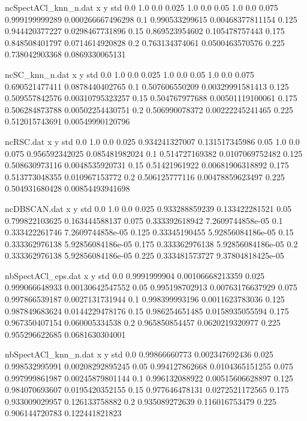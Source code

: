\begin{filecontents}{ncSpectACl_knn_n.dat}
x y std
0.0 1.0 0.0
0.025 1.0 0.0
0.05 1.0 0.0
0.075 0.999199999289 0.000266667496298
0.1 0.990533299615 0.00468377811154
0.125 0.944420377227 0.0298467731896
0.15 0.869523954602 0.105478757443
0.175 0.848508401797 0.0714614920828
0.2 0.763134374061 0.0500463570576
0.225 0.738042903368 0.0869330065131
\end{filecontents}
\begin{filecontents}{ncSC_knn_n.dat}
x y std
0.0 1.0 0.0
0.025 1.0 0.0
0.05 1.0 0.0
0.075 0.690521477411 0.0878440402765
0.1 0.507606550209 0.00329991581413
0.125 0.509557842576 0.00310795323257
0.15 0.504767977688 0.00501119100061
0.175 0.506284873788 0.00502254430751
0.2 0.506990078372 0.00222245241465
0.225 0.512015743691 0.00549990120796
\end{filecontents}
\begin{filecontents}{ncRSC.dat}
x y std
0.0 1.0 0.0
0.025 0.934241327007 0.131517345986
0.05 1.0 0.0
0.075 0.956592342025 0.085481982024
0.1 0.514727169382 0.0107069752482
0.125 0.508630973116 0.0048535920731
0.15 0.51421961922 0.00681906318892
0.175 0.513773048355 0.010967153772
0.2 0.506125777116 0.00478859623497
0.225 0.504931680428 0.00854493941698
\end{filecontents}
\begin{filecontents}{ncDBSCAN.dat}
x y std
0.0 1.0 0.0
0.025 0.933288859239 0.133422281521
0.05 0.799822103625 0.163444588137
0.075 0.333392618942 7.2609744858e-05
0.1 0.333422261746 7.2609744858e-05
0.125 0.33345190455 5.92856084186e-05
0.15 0.333362976138 5.92856084186e-05
0.175 0.333362976138 5.92856084186e-05
0.2 0.333362976138 5.92856084186e-05
0.225 0.333481573727 9.37804818425e-05
\end{filecontents}
\begin{filecontents}{nbSpectACl_eps.dat}
x y std
0.0 0.9991999904 0.00106668213359
0.025 0.999066648933 0.00130642547552
0.05 0.995198702913 0.00763176637929
0.075 0.997866539187 0.0027131731944
0.1 0.998399993196 0.0011623783036
0.125 0.987849683624 0.0144229478176
0.15 0.986254651485 0.0158935055594
0.175 0.967350407154 0.060005334538
0.2 0.965850854457 0.0620219320977
0.225 0.955296622685 0.0681630304001
\end{filecontents}
\begin{filecontents}{nbSpectACl_knn_n.dat}
x y std
0.0 0.99866660773 0.002347692436
0.025 0.998532995991 0.00208292895245
0.05 0.994127862668 0.0104365151255
0.075 0.997999861987 0.00245879801144
0.1 0.996132088922 0.00515606628897
0.125 0.984070693607 0.0195420352155
0.15 0.977646478131 0.0272521172565
0.175 0.933009029957 0.126133758882
0.2 0.935089272639 0.116016753479
0.225 0.906144720783 0.122441821823
\end{filecontents}
